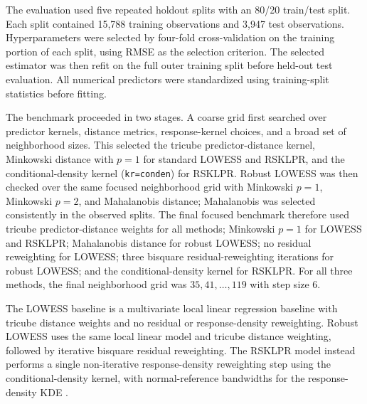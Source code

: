 \documentclass[preprint,1p,times,authoryear]{elsarticle}
\begin{document}
The evaluation used five repeated holdout splits with an 80/20 train/test split. Each split contained 15,788 training observations and 3,947 test observations. Hyperparameters were selected by four-fold cross-validation on the training portion of each split, using RMSE as the selection criterion. The selected estimator was then refit on the full outer training split before held-out test evaluation. All numerical predictors were standardized using training-split statistics before fitting.

The benchmark proceeded in two stages. A coarse grid first searched over predictor kernels, distance metrics, response-kernel choices, and a broad set of neighborhood sizes. This selected the tricube predictor-distance kernel, Minkowski distance with $p=1$ for standard LOWESS and RSKLPR, and the conditional-density kernel (\texttt{kr=conden}) for RSKLPR. Robust LOWESS was then checked over the same focused neighborhood grid with Minkowski $p=1$, Minkowski $p=2$, and Mahalanobis distance; Mahalanobis was selected consistently in the observed splits. The final focused benchmark therefore used tricube predictor-distance weights for all methods; Minkowski $p=1$ for LOWESS and RSKLPR; Mahalanobis distance for robust LOWESS; no residual reweighting for LOWESS; three bisquare residual-reweighting iterations for robust LOWESS; and the conditional-density kernel for RSKLPR. For all three methods, the final neighborhood grid was $35,41,\ldots,119$ with step size 6.

The LOWESS baseline is a multivariate local linear regression baseline with tricube distance weights and no residual or response-density reweighting. Robust LOWESS uses the same local linear model and tricube distance weighting, followed by iterative bisquare residual reweighting. The RSKLPR model instead performs a single non-iterative response-density reweighting step using the conditional-density kernel, with normal-reference bandwidths for the response-density KDE \citep{Silverman1986}.
\end{document}
